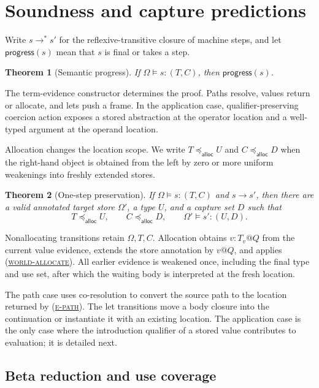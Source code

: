 \documentclass[acmsmall,screen,nonacm]{acmart}
\newtheorem{theorem}{Theorem}
\newcommand{\ruleref}[1]{%
  \textsc{(\hyperref[rule:#1]{#1})}}
\newcommand{\sstep}{\longrightarrow}
\newcommand{\steps}{\longrightarrow^{*}}
\newcommand{\extends}{\mathrel{\preccurlyeq_{\mathsf{alloc}}}}
\begin{document}
\section{Soundness and capture predictions}
\label{sec:soundness}

Write \(s\steps s'\) for the reflexive-transitive closure of machine steps,
and let \(\mathsf{progress}(s)\) mean that \(s\) is final or takes a step.

\begin{theorem}[Semantic progress]
\label{thm:semantic-progress}
If \(\Omega\models s:(T,C)\), then \(\mathsf{progress}(s)\).
\end{theorem}

The term-evidence constructor determines the proof.  Paths resolve, values
return or allocate, and lets push a frame.  In the application case,
qualifier-preserving coercion action exposes a stored abstraction at the
operator location and a well-typed argument at the operand location.

Allocation changes the location scope.  We write \(T\extends U\) and
\(C\extends D\) when the right-hand object is obtained from the left by zero
or more uniform weakenings into freshly extended stores.

\begin{theorem}[One-step preservation]
\label{thm:preservation}
If \(\Omega\models s:(T,C)\) and \(s\sstep s'\), then there are a valid
annotated target store \(\Omega'\), a type \(U\), and a capture set \(D\)
such that
\[
 T\extends U,
 \qquad C\extends D,
 \qquad \Omega'\models s':(U,D).
\]
\end{theorem}

Nonallocating transitions retain \(\Omega,T,C\).  Allocation obtains
\(v:T_v@Q\) from the current value evidence, extends the store annotation by
\(v@Q\), and applies \ruleref{world-allocate}.  All earlier evidence is
weakened once, including the final type and use set, after which the waiting
body is interpreted at the fresh location.

The path case uses co-resolution to convert the source path to the location
returned by \ruleref{e-path}.  The let transitions move a body closure into
the continuation or instantiate it with an existing location.  The
application case is the only case where the introduction qualifier of a
stored value contributes to evaluation; it is detailed next.

\subsection{Beta reduction and use coverage}
\end{document}
